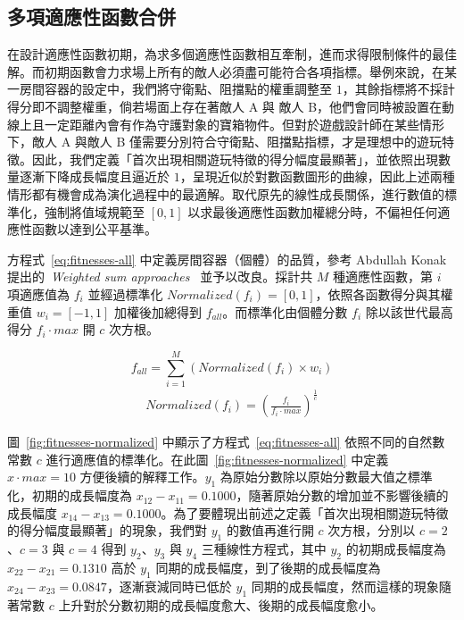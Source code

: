 \subsection{多項適應性函數合併}
\label{ssec:method-segments-multiobjectives}

在設計適應性函數初期，為求多個適應性函數相互牽制，進而求得限制條件的最佳解。而初期函數會力求場上所有的敵人必須盡可能符合各項指標。舉例來說，在某一房間容器的設定中，我們將守衛點、阻擋點的權重調整至 $1$，其餘指標將不採計得分即不調整權重，倘若場面上存在著敵人 A 與 敵人 B，他們會同時被設置在動線上且一定距離內會有作為守護對象的寶箱物件。但對於遊戲設計師在某些情形下，敵人 A 與敵人 B 僅需要分別符合守衛點、阻擋點指標，才是理想中的遊玩特徵。因此，我們定義「首次出現相關遊玩特徵的得分幅度最顯著」，並依照出現數量逐漸下降成長幅度且逼近於 $1$，呈現近似於對數函數圖形的曲線，因此上述兩種情形都有機會成為演化過程中的最適解。取代原先的線性成長關係，進行數值的標準化，強制將值域規範至 $[0, 1]$ 以求最後適應性函數加權總分時，不偏袒任何適應性函數以達到公平基準。

方程式~\ref{eq:fitnesses-all} 中定義房間容器（個體）的品質，參考 Abdullah Konak 提出的~\textit{Weighted sum approaches}~\cite{konak2006multi} 並予以改良。採計共 $M$ 種適應性函數，第 $i$ 項適應值為 $f_{i}$ 並經過標準化 $Normalized(f_{i}) = [0, 1]$，依照各函數得分與其權重值 $w_{i} = [-1, 1]$ 加權後加總得到 $f_{all}$。而標準化由個體分數 $f_{i}$ 除以該世代最高得分 $f_{i}\cdot max$ 開 $c$ 次方根。

\begin{equation}
    \label{eq:fitnesses-all}
    f_{all} = \sum_{i=1}^{M} (Normalized(f_{i}) \times w_{i})
\end{equation}
\begin{gather*}
    Normalized(f_{i}) = (\frac{f_{i}}{f_{i}\cdot max})^{\frac{1}{c}}
\end{gather*}

圖~\ref{fig:fitnesses-normalized} 中顯示了方程式~\ref{eq:fitnesses-all} 依照不同的自然數常數 $c$ 進行適應值的標準化。在此圖~\ref{fig:fitnesses-normalized} 中定義 $x\cdot max = 10$ 方便後續的解釋工作。$y_{1}$ 為原始分數除以原始分數最大值之標準化，初期的成長幅度為 $x_{12} - x_{11} = 0.1000$，隨著原始分數的增加並不影響後續的成長幅度 $x_{14} - x_{13} = 0.1000$。為了要體現出前述之定義「首次出現相關遊玩特徵的得分幅度最顯著」的現象，我們對 $y_{1}$ 的數值再進行開 $c$ 次方根，分別以 $c = 2$、$c = 3$ 與 $c = 4$ 得到 $y_{2}$、$y_{3}$ 與 $y_{4}$ 三種線性方程式，其中 $y_{2}$ 的初期成長幅度為 $x_{22} - x_{21} = 0.1310$ 高於 $y_{1}$ 同期的成長幅度，到了後期的成長幅度為 $x_{24} - x_{23} = 0.0847$，逐漸衰減同時已低於 $y_{1}$ 同期的成長幅度，然而這樣的現象隨著常數 $c$ 上升對於分數初期的成長幅度愈大、後期的成長幅度愈小。

